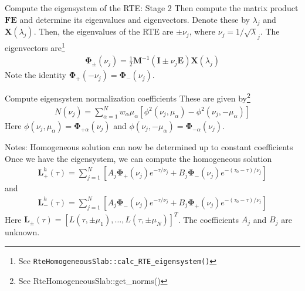 \documentclass{beamer}
\newcommand{\mvec}[1]{\mathbf{#1}}
\newcommand{\gvec}[1]{\boldsymbol{#1}}
\begin{document}
\begin{frame}{Compute the eigensystem of the RTE: Stage 2}
  Then compute the matrix product $\mvec{F}\mvec{E}$ and determine its
  eigenvalues and eigenvectors. Denote these by $\lambda_j$ and
  $\mvec{X}(\lambda_j)$.  Then, the eigenvalues of the RTE are $\pm
  \nu_j$, where $\nu_j = 1/\sqrt\lambda_j$. The eigenvectors
  are\footnote{See {\tt RteHomogeneousSlab::calc\_RTE\_eigensystem()}}
  \begin{align}
    \gvec{\Phi}_\pm (\nu_j)
    = \frac{1}{2}\mvec{M}^{-1}
    (\mvec{I} \pm \nu_j\mvec{E})\mvec{X}(\lambda_j)
  \end{align}
  Note the identity $\gvec{\Phi}_+(-\nu_j) =
  \gvec{\Phi}_-(\nu_j)$.
\end{frame}

\begin{frame}{Compute eigensystem normalization coefficients}
  These are given by\footnote{See RteHomogeneousSlab::get\_norms()}
  \begin{align}
    N(\nu_j) = \sum_{\alpha=1}^N
    w_\alpha \mu_\alpha
    \left[
      \phi^2(\nu_j,\mu_\alpha) - \phi^2(\nu_j,-\mu_\alpha)
    \right]
  \end{align}
  Here $\phi(\nu_j,\mu_\alpha) = \gvec{\Phi}_{+\alpha}(\nu_j)$ and
  $\phi(\nu_j,-\mu_\alpha) = \gvec{\Phi}_{-\alpha}(\nu_j)$.

\end{frame}

\begin{frame}{Notes: Homogeneous solution can now be determined up to
    constant coefficients}
  Once we have the eigensystem, we can compute the homogeneous solution
  \begin{align}
    \mvec{L}^h_+(\tau) = \sum_{j=1}^N
    \left[
      A_j \gvec{\Phi}_+(\nu_j) e^{-\tau/\nu_j} +
      B_j \gvec{\Phi}_-(\nu_j) e^{-(\tau_0-\tau)/\nu_j}
    \right]
  \end{align}
  and
  \begin{align}
    \mvec{L}^h_-(\tau) = \sum_{j=1}^N
    \left[
      A_j \gvec{\Phi}_-(\nu_j) e^{-\tau/\nu_j} +
      B_j \gvec{\Phi}_+(\nu_j) e^{-(\tau_0-\tau)/\nu_j}
    \right]
  \end{align}
  Here $\mvec{L}_\pm(\tau) = [L(\tau,\pm\mu_1),\ldots,
  L(\tau,\pm\mu_N)]^T$. The coefficients $A_j$ and $B_j$ are unknown.
\end{frame}
\end{document}
